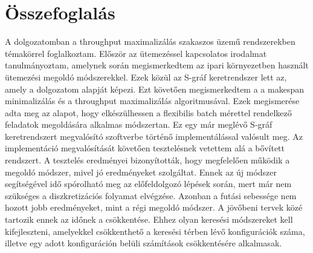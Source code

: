 \chapter{Összefoglalás}
A dolgozatomban a throughput maximalizálás szakaszos üzemű rendszerekben témakörrel foglalkoztam. Először az ütemezéssel kapcsolatos irodalmat tanulmányoztam, amelynek során megismerkedtem az ipari környezetben használt ütemezési megoldó módszerekkel. Ezek közül az S-gráf keretrendszer lett az, amely a dolgozatom alapját képezi. Ezt követően megismerkedtem a a makespan minimalizálás és a throughput maximalizálás algoritmusával. Ezek megismerése adta meg az alapot, hogy elkészülhessen a flexibilis batch mérettel rendelkező feladatok megoldására alkalmas módszertan. Ez egy már meglévő S-gráf keretrendszert megvalósító szoftverbe történő implementálással valósult meg. Az implementáció megvalósítását követően tesztelésnek vetettem alá a bővített rendszert. A tesztelés eredményei bizonyították, hogy megfelelően működik a megoldó módszer, mivel jó eredményeket szolgáltat. Ennek az új módszer segítségével idő spórolható meg az előfeldolgozó lépések során, mert már nem szükséges a diszkretizációs folyamat elvégzése. Azonban a futási sebessége nem hozott jobb eredményeket, mint a régi megoldó módszer. A jövőbeni tervek közé tartozik ennek az időnek a csökkentése. Ehhez olyan keresési módszereket kell kifejleszteni, amelyekkel csökkenthető a keresési térben lévő konfigurációk száma, illetve egy adott konfiguráción belüli számítások csökkentésére alkalmasak.